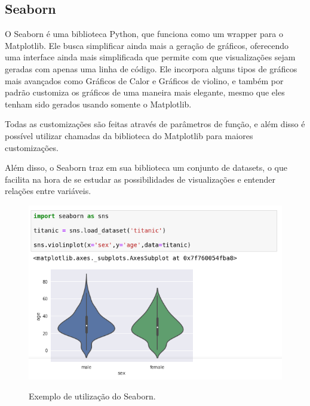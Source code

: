 \subsection{Seaborn}
\label{ss.seaborn}

O Seaborn é uma biblioteca Python, que funciona como um wrapper para o Matplotlib. Ele busca simplificar ainda mais a geração de gráficos, oferecendo uma interface ainda mais simplificada que permite com que visualizações sejam geradas com apenas uma linha de código. Ele incorpora alguns tipos de gráficos mais avançados como Gráficos de Calor e Gráficos de violino, e também por padrão customiza os gráficos de uma maneira mais elegante, mesmo que eles tenham sido gerados usando somente o Matplotlib.

Todas as customizações são feitas através de parâmetros de função, e além disso é possível utilizar chamadas da biblioteca do Matplotlib para maiores customizações.

Além disso, o Seaborn traz em sua biblioteca um conjunto de datasets, o que facilita na hora de se estudar as possibilidades de visualizações e entender relações entre variáveis.

\begin{figure}[h]
\caption{\small Exemplo de utilização do Seaborn.}
\centering
\includegraphics[scale=2.5]{figs/exemplo-seaborn.png}
\label{f.exemplo-seaborn}
\end{figure}
